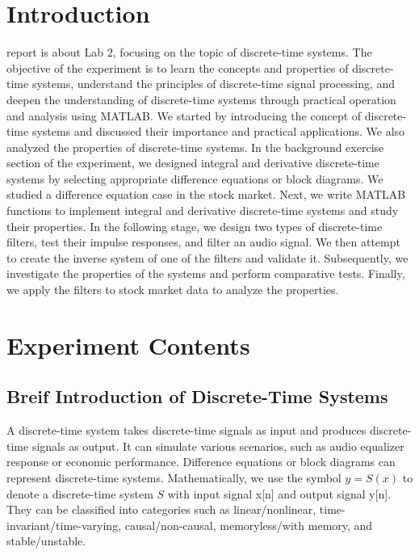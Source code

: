 \documentclass[journal]{IEEEtran}
\begin{document}
\section{Introduction}
 report is about Lab 2, focusing on the topic of discrete-time systems. The objective of the experiment is to learn the concepts and properties of discrete-time systems, understand the principles of discrete-time signal processing, and deepen the understanding of discrete-time systems through practical operation and analysis using MATLAB. We started by introducing the concept of discrete-time systems and discussed their importance and practical applications. We also analyzed the properties of discrete-time systems. In the background exercise section of the experiment, we designed integral and derivative discrete-time systems by selecting appropriate difference equations or block diagrams. We studied a difference equation case in the stock market. Next, we write MATLAB functions to implement integral and derivative discrete-time systems and study their properties. In the following stage, we design two types of discrete-time filters, test their impulse responses, and filter an audio signal. We then attempt to create the inverse system of one of the filters and validate it. Subsequently, we investigate the properties of the systems and perform comparative tests. Finally, we apply the filters to stock market data to analyze the properties.





\section{Experiment Contents}
\label{sec:guidelines}


\subsection{Breif Introduction of Discrete-Time Systems}

A discrete-time system takes discrete-time signals as input and produces discrete-time signals as output. It can simulate various scenarios, such as audio equalizer response or economic performance. Difference equations or block diagrams can represent discrete-time systems. Mathematically, we use the symbol $y = S(x)$ to denote a discrete-time system $S$ with input signal x[n] and output signal y[n]. They can be classified into categories such as linear/nonlinear, time-invariant/time-varying, causal/non-causal, memoryless/with memory, and stable/unstable.
\end{document}
